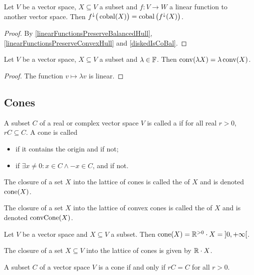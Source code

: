 \begin{lemma} \label{linearFunctionsPreserveDiskedHull}
Let $V$ be a vector space, $X\subseteq V$ a subset and $f: V\to W$ a linear function to another vector space. Then $f^\downarrow\big(\operatorname{cobal}(X)\big) = \operatorname{cobal}\big(f^\downarrow(X)\big)$. 
\end{lemma}
\begin{proof}
By \ref{linearFunctionsPreserveBalancedHull}, \ref{linearFunctionsPreserveConvexHull} and \ref{diskedIsCoBal}.
\end{proof}
\begin{corollary} \label{diskedHullHomogeneous}
Let $V$ be a vector space, $X\subseteq V$ a subset and $\lambda\in \mathbb{F}$. Then $\operatorname{conv}(\lambda X) = \lambda \operatorname{conv}(X)$.
\end{corollary}
\begin{proof}
The function $v\mapsto \lambda v$ is linear.
\end{proof}

\subsection{Cones}
\begin{definition}
A subset $C$ of a real or complex vector space $V$ is called a  if for all real $r>0$, $rC \subseteq C$. A cone is called
\begin{itemize}
\item {} if it contains the origin and  if not;
\item {} if $\exists x\neq 0: x\in C \land -x\in C$, and  if not.
\end{itemize}
The closure of a set $X$ into the lattice of cones is called the  of $X$ and is denoted $\operatorname{cone}(X)$.

The closure of a set $X$ into the lattice of convex cones is called the  of $X$ and is denoted $\operatorname{convCone}(X)$.
\end{definition}

\begin{lemma}
Let $V$ be a vector space and $X\subseteq V$ a subset. Then $\cone(X) = \R^{> 0}\cdot X = \interval[o]{0,+\infty}$.
\end{lemma}

The closure of a set $X\subseteq V$ into the lattice of cones is given by $\mathbb{R}\cdot X$.

\begin{lemma} \label{coneEqualityLemma}
A subset $C$ of a vector space $V$ is a cone \textup{if and only if} $rC = C$ for all $r> 0$.
\end{lemma}

